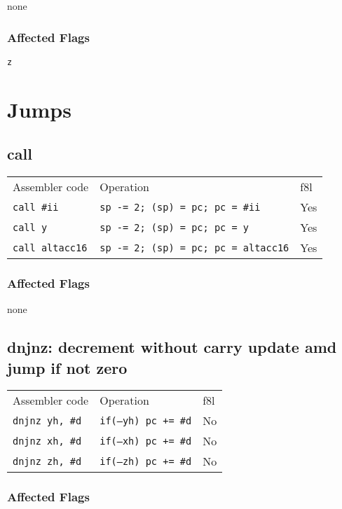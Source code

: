 \documentclass{book}
\begin{document}
none


\subsubsection*{Affected Flags}

\texttt{z}


\section{Jumps}

\subsection{call}

\begin{tabular}{l l l}
Assembler code         & Operation                                  & f8l \\
\texttt{call \#ii}     & \texttt{sp -= 2; (sp) = pc; pc = \#ii}     & Yes \\
\texttt{call y}        & \texttt{sp -= 2; (sp) = pc; pc = y}        & Yes \\
\texttt{call altacc16} & \texttt{sp -= 2; (sp) = pc; pc = altacc16} & Yes \\
\end{tabular}

\subsubsection*{Affected Flags}

none


\subsection{dnjnz: decrement without carry update amd jump if not zero}

\begin{tabular}{l l l}
Assembler code         & Operation          & f8l \\
\texttt{dnjnz yh, \#d} & \texttt{if(--yh) pc += \#d} & No \\
\texttt{dnjnz xh, \#d} & \texttt{if(--xh) pc += \#d} & No \\
\texttt{dnjnz zh, \#d} & \texttt{if(--zh) pc += \#d} & No \\
\end{tabular}

\subsubsection*{Affected Flags}
\end{document}
